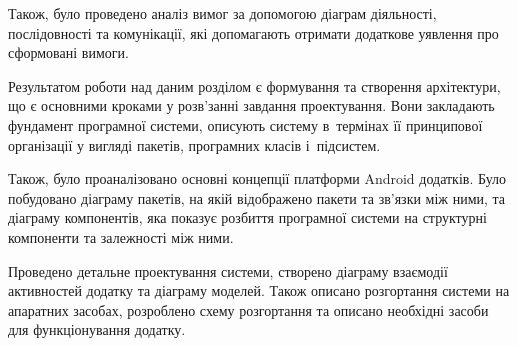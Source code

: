 \documentclass[../main.tex]{subfiles}
\begin{document}
Також, було проведено аналіз вимог за допомогою діаграм діяльності, послідовності та комунікації, які допомагають отримати додаткове уявлення про сформовані вимоги.

Результатом роботи над даним розділом є формування та створення архітектури, що є основними кроками у розв'занні завдання проектування. Вони закладають фундамент програмної системи, описують систему в~термінах її принципової організації у вигляді пакетів, програмних класів і~підсистем.

\newpage
Також, було проаналізовано основні концепції платформи Android додатків. Було побудовано діаграму пакетів, на якій відображено пакети та зв'язки між ними, та діаграму компонентів, яка показує розбиття програмної системи на структурні компоненти та залежності між ними.

Проведено детальне проектування системи, створено діаграму взаємодії активностей додатку та діаграму моделей. Також описано розгортання системи на апаратних засобах, розроблено схему розгортання та описано необхідні засоби для функціонування додатку.
\end{document}
